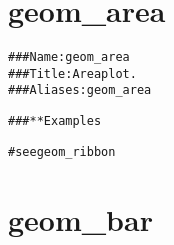 \documentclass[a4paper,titlepage]{tufte-handout}\usepackage[]{graphicx}\usepackage[]{color}
\makeatletter
\newenvironment{kframe}{%
 \def\at@end@of@kframe{}%
 \ifinner\ifhmode%
  \def\at@end@of@kframe{\end{minipage}}%
  \begin{minipage}{\columnwidth}%
 \fi\fi%
 \def\FrameCommand##1{\hskip\@totalleftmargin \hskip-\fboxsep
 \colorbox{shadecolor}{##1}\hskip-\fboxsep
     \hskip-\linewidth \hskip-\@totalleftmargin \hskip\columnwidth}%
 \MakeFramed {\advance\hsize-\width
   \@totalleftmargin\z@ \linewidth\hsize
   \@setminipage}}%
 {\par\unskip\endMakeFramed%
 \at@end@of@kframe}
\newenvironment{knitrout}{}{} %
\makeatother
\begin{document}
\section{geom\_area}

\begin{knitrout}
\color{fgcolor}\begin{kframe}
\begin{alltt}
### Name: geom_area
### Title: Area plot.
### Aliases: geom_area

### ** Examples

# see geom_ribbon



\end{alltt}
\end{kframe}
\end{knitrout}



\section{geom\_bar}
\end{document}
